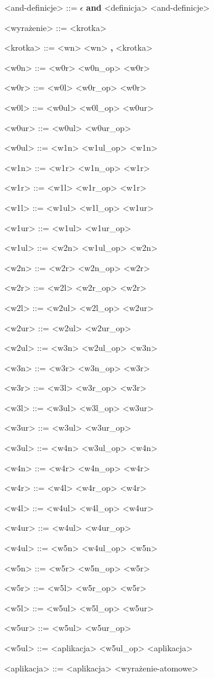 \documentclass[12pt]{article}
\begin{document}
\begin{grammar}
<and-definicje> ::=
    $\epsilon$
    \alt \textbf{and} <definicja> <and-definicje>

<wyrażenie> ::=
    <krotka>

<krotka> ::=
    <wn>
    \alt <wn> \textbf{,} <krotka>

<w0n> ::=
    <w0r>
     <w0n_op> <w0r>

<w0r> ::=
    <w0l>
     <w0r_op> <w0r>

<w0l> ::=
    <w0ul>
     <w0l_op> <w0ur>

<w0ur> ::=
    <w0ul>
     <w0ur_op> 
    
<w0ul> ::=
    <w1n>
    \alt <w1ul_op> <w1n>

<w1n> ::=
    <w1r>
     <w1n_op> <w1r>

<w1r> ::=
    <w1l>
     <w1r_op> <w1r>

<w1l> ::=
    <w1ul>
     <w1l_op> <w1ur>

<w1ur> ::=
    <w1ul>
     <w1ur_op> 
    
<w1ul> ::=
    <w2n>
    \alt <w1ul_op> <w2n>

<w2n> ::=
    <w2r>
     <w2n_op> <w2r>

<w2r> ::=
    <w2l>
     <w2r_op> <w2r>

<w2l> ::=
    <w2ul>
     <w2l_op> <w2ur>

<w2ur> ::=
    <w2ul>
     <w2ur_op> 
    
<w2ul> ::=
    <w3n>
    \alt <w2ul_op> <w3n>

    <w3n> ::=
    <w3r>
     <w3n_op> <w3r>

<w3r> ::=
    <w3l>
     <w3r_op> <w3r>

<w3l> ::=
    <w3ul>
     <w3l_op> <w3ur>

<w3ur> ::=
    <w3ul>
     <w3ur_op> 
    
<w3ul> ::=
    <w4n>
    \alt <w3ul_op> <w4n>

<w4n> ::=
    <w4r>
     <w4n_op> <w4r>

<w4r> ::=
    <w4l>
     <w4r_op> <w4r>

<w4l> ::=
    <w4ul>
     <w4l_op> <w4ur>

<w4ur> ::=
    <w4ul>
     <w4ur_op> 
    
<w4ul> ::=
    <w5n>
    \alt <w4ul_op> <w5n>

<w5n> ::=
    <w5r>
     <w5n_op> <w5r>

<w5r> ::=
    <w5l>
     <w5r_op> <w5r>

<w5l> ::=
    <w5ul>
     <w5l_op> <w5ur>

<w5ur> ::=
    <w5ul>
     <w5ur_op>
    
<w5ul> ::=
    <aplikacja>
    \alt <w5ul_op> <aplikacja>

<aplikacja> ::=
    <aplikacja> <wyrażenie-atomowe>

\end{grammar}
\end{document}
